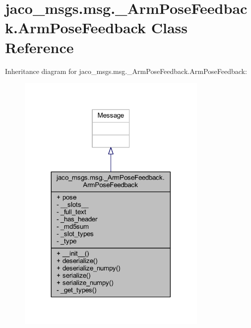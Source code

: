 \hypertarget{classjaco__msgs_1_1msg_1_1__ArmPoseFeedback_1_1ArmPoseFeedback}{}\section{jaco\+\_\+msgs.\+msg.\+\_\+\+Arm\+Pose\+Feedback.\+Arm\+Pose\+Feedback Class Reference}
\label{classjaco__msgs_1_1msg_1_1__ArmPoseFeedback_1_1ArmPoseFeedback}


Inheritance diagram for jaco\+\_\+msgs.\+msg.\+\_\+\+Arm\+Pose\+Feedback.\+Arm\+Pose\+Feedback\+:
\nopagebreak
\begin{figure}[H]
\begin{center}
\leavevmode
\includegraphics[width=260pt]{d8/da3/classjaco__msgs_1_1msg_1_1__ArmPoseFeedback_1_1ArmPoseFeedback__inherit__graph}
\end{center}
\end{figure}


